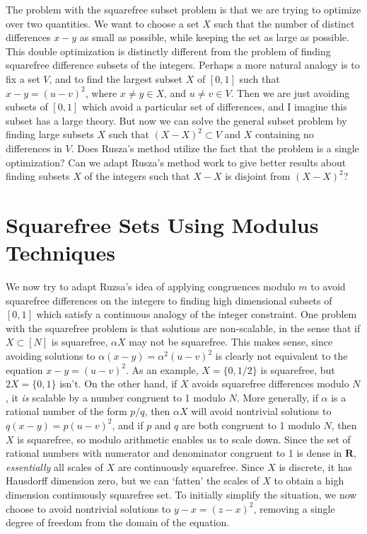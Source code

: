 \documentclass{report}
\theoremstyle{plain}
\theoremstyle{plain}
\begin{document}
The problem with the squarefree subset problem is that we are trying to optimize over two quantities. We want to choose a set $X$ such that the number of distinct differences $x - y$ as small as possible, while keeping the set as large as possible. This double optimization is distinctly different from the problem of finding squarefree difference subsets of the integers. Perhaps a more natural analogy is to fix a set $V$, and to find the largest subset $X$ of $[0,1]$ such that $x - y = (u - v)^2$, where $x \neq y \in X$, and $u \neq v \in V$. Then we are just avoiding subsets of $[0,1]$ which avoid a particular set of differences, and I imagine this subset has a large theory. But now we can solve the general subset problem by finding large subsets $X$ such that $(X - X)^2 \subset V$ and $X$ containing no differences in $V$. Does Rusza's method utilize the fact that the problem is a single optimization? Can we adapt Rusza's method work to give better results about finding subsets $X$ of the integers such that $X - X$ is disjoint from $(X - X)^2$?

\section{Squarefree Sets Using Modulus Techniques}

We now try to adapt Ruzsa's idea of applying congruences modulo $m$ to avoid squarefree differences on the integers to finding high dimensional subsets of $[0,1]$ which satisfy a continuous analogy of the integer constraint. One problem with the squarefree problem is that solutions are non-scalable, in the sense that if $X \subset [N]$ is squarefree, $\alpha X$ may not be squarefree. This makes sense, since avoiding solutions to $\alpha (x - y) = \alpha^2 (u - v)^2$ is clearly not equivalent to the equation $x - y = (u - v)^2$. As an example, $X = \{ 0, 1/2 \}$ is squarefree, but $2X = \{ 0, 1 \}$ isn't. On the other hand, if $X$ avoids squarefree differences modulo $N$, it {\it is} scalable by a number congruent to 1 modulo $N$. More generally, if $\alpha$ is a rational number of the form $p/q$, then $\alpha X$ will avoid nontrivial solutions to $q (x - y) = p (u - v)^2$, and if $p$ and $q$ are both congruent to 1 modulo $N$, then $X$ is squarefree, so modulo arithmetic enables us to scale down. Since the set of rational numbers with numerator and denominator congruent to 1 is dense in $\mathbf{R}$, {\it essentially} all scales of $X$ are continuously squarefree. Since $X$ is discrete, it has Hausdorff dimension zero, but we can `fatten' the scales of $X$ to obtain a high dimension continuously squarefree set. To initially simplify the situation, we now choose to avoid nontrivial solutions to $y - x = (z - x)^2$, removing a single degree of freedom from the domain of the equation.
\end{document}
